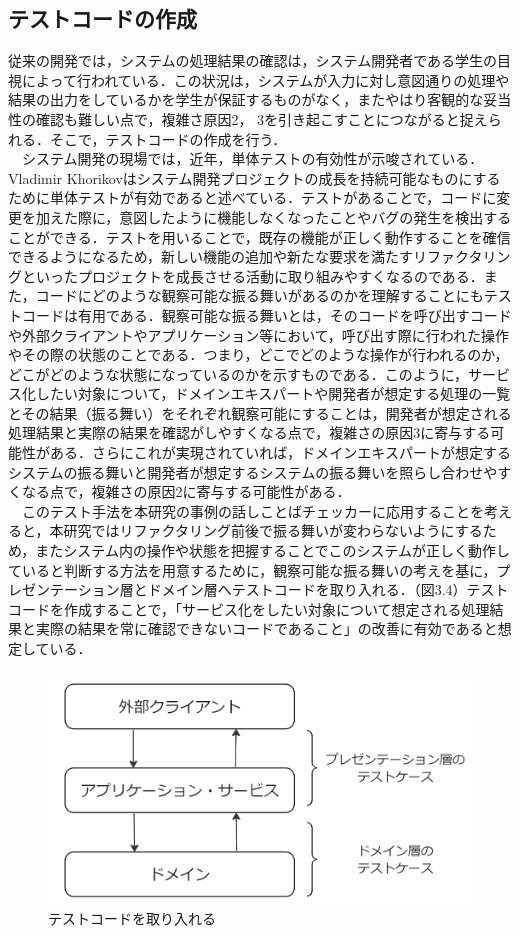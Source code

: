 \documentclass[12pt, a4paper]{jreport}
\begin{document}
\subsection{テストコードの作成}
従来の開発では，システムの処理結果の確認は，システム開発者である学生の目視によって行われている．この状況は，システムが入力に対し意図通りの処理や結果の出力をしているかを学生が保証するものがなく，またやはり客観的な妥当性の確認も難しい点で，複雑さ原因2， 3を引き起こすことにつながると捉えられる．そこで，テストコードの作成を行う．
\\　システム開発の現場では，近年，単体テストの有効性が示唆されている．Vladimir Khorikov\cite{Tantai}はシステム開発プロジェクトの成長を持続可能なものにするために単体テストが有効であると述べている．テストがあることで，コードに変更を加えた際に，意図したように機能しなくなったことやバグの発生を検出することができる．テストを用いることで，既存の機能が正しく動作することを確信できるようになるため，新しい機能の追加や新たな要求を満たすリファクタリングといったプロジェクトを成長させる活動に取り組みやすくなるのである．また，コードにどのような観察可能な振る舞いがあるのかを理解することにもテストコードは有用である．観察可能な振る舞いとは，そのコードを呼び出すコードや外部クライアントやアプリケーション等において，呼び出す際に行われた操作やその際の状態のことである．つまり，どこでどのような操作が行われるのか，どこがどのような状態になっているのかを示すものである．このように，サービス化したい対象について，ドメインエキスパートや開発者が想定する処理の一覧とその結果（振る舞い）をそれぞれ観察可能にすることは，開発者が想定される処理結果と実際の結果を確認がしやすくなる点で，複雑さの原因3に寄与する可能性がある．さらにこれが実現されていれば，ドメインエキスパートが想定するシステムの振る舞いと開発者が想定するシステムの振る舞いを照らし合わせやすくなる点で，複雑さの原因2に寄与する可能性がある．
\\　このテスト手法を本研究の事例の話しことばチェッカーに応用することを考えると，本研究ではリファクタリング前後で振る舞いが変わらないようにするため，またシステム内の操作や状態を把握することでこのシステムが正しく動作していると判断する方法を用意するために，観察可能な振る舞いの考えを基に，プレゼンテーション層とドメイン層へテストコードを取り入れる．（図3.4）テストコードを作成することで，「サービス化をしたい対象について想定される処理結果と実際の結果を常に確認できないコードであること」の改善に有効であると想定している．
\begin{figure}[H]
\centering
\includegraphics[width=1\linewidth]{image/layerTest.png}
\caption{テストコードを取り入れる}
\label{fig:enter-label}
\end{figure}
\end{document}

